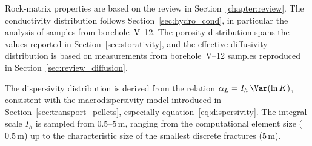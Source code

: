 Rock-matrix properties are based on the review in Section~\ref{chapter:review}.
The conductivity distribution follows Section~\ref{sec:hydro_cond}, in particular the analysis of samples from borehole~V--12.
The porosity distribution spans the values reported in Section~\ref{sec:storativity}, and the effective diffusivity distribution
is based on measurements from borehole~V--12 samples reproduced in Section~\ref{sec:review_diffusion}.

The dispersivity distribution is derived from the relation $\alpha_L = I_h\,\Var(\ln K)$, consistent with the macrodispersivity model introduced in Section~\ref{sec:transport_pellets}, especially equation~\eqref{eq:dispersivity}.
The integral scale $I_h$ is sampled from $0.5$--$5\,\mathrm{m}$, ranging from the computational element size ($0.5\,\mathrm{m}$)
up to the characteristic size of the smallest discrete fractures ($5\,\mathrm{m}$).




